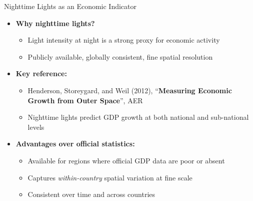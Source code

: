 \documentclass[dvipsnames,hyperref={pdfpagelabels=false}]{beamer}
\begin{document}
\begin{frame}{Nighttime Lights as an Economic Indicator}
\begin{itemize}
  \item \textbf{Why nighttime lights?}
  \vspace{0.2cm}
  \begin{itemize}
    \item Light intensity at night is a strong proxy for economic activity
    \vspace{0.1cm}
    \item Publicly available, globally consistent, fine spatial resolution
  \end{itemize}
  \vspace{0.3cm}
  \item \textbf{Key reference:}
  \vspace{0.1cm}
  \begin{itemize}
    \item Henderson, Storeygard, and Weil (2012),
          ``\textbf{Measuring Economic Growth from Outer Space}'', AER
    \vspace{0.1cm}
    \item Nighttime lights predict GDP growth at both national and
          sub-national levels
  \end{itemize}
  \vspace{0.3cm}
  \item \textbf{Advantages over official statistics:}
  \vspace{0.1cm}
  \begin{itemize}
    \item Available for regions where official GDP data are poor or absent
    \vspace{0.1cm}
    \item Captures \emph{within-country} spatial variation at fine scale
    \vspace{0.1cm}
    \item Consistent over time and across countries
  \end{itemize}
\end{itemize}
\end{frame}
\end{document}
